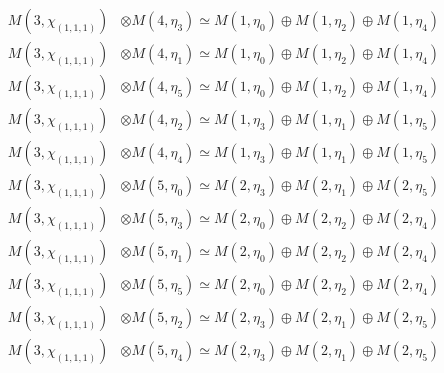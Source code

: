 \begin{align*}
M(3,\chi_{(1,1,1)}) &\otimes M(4,\eta_{3}) \simeq M(1,\eta_{0}) \oplus M(1,\eta_{2}) \oplus M(1,\eta_{4})\\
M(3,\chi_{(1,1,1)}) &\otimes M(4,\eta_{1}) \simeq M(1,\eta_{0}) \oplus M(1,\eta_{2}) \oplus M(1,\eta_{4})\\
M(3,\chi_{(1,1,1)}) &\otimes M(4,\eta_{5}) \simeq M(1,\eta_{0}) \oplus M(1,\eta_{2}) \oplus M(1,\eta_{4})\\
M(3,\chi_{(1,1,1)}) &\otimes M(4,\eta_{2}) \simeq M(1,\eta_{3}) \oplus M(1,\eta_{1}) \oplus M(1,\eta_{5})\\
M(3,\chi_{(1,1,1)}) &\otimes M(4,\eta_{4}) \simeq M(1,\eta_{3}) \oplus M(1,\eta_{1}) \oplus M(1,\eta_{5})\\
M(3,\chi_{(1,1,1)}) &\otimes M(5,\eta_{0}) \simeq M(2,\eta_{3}) \oplus M(2,\eta_{1}) \oplus M(2,\eta_{5})\\
M(3,\chi_{(1,1,1)}) &\otimes M(5,\eta_{3}) \simeq M(2,\eta_{0}) \oplus M(2,\eta_{2}) \oplus M(2,\eta_{4})\\
M(3,\chi_{(1,1,1)}) &\otimes M(5,\eta_{1}) \simeq M(2,\eta_{0}) \oplus M(2,\eta_{2}) \oplus M(2,\eta_{4})\\
M(3,\chi_{(1,1,1)}) &\otimes M(5,\eta_{5}) \simeq M(2,\eta_{0}) \oplus M(2,\eta_{2}) \oplus M(2,\eta_{4})\\
M(3,\chi_{(1,1,1)}) &\otimes M(5,\eta_{2}) \simeq M(2,\eta_{3}) \oplus M(2,\eta_{1}) \oplus M(2,\eta_{5})\\
M(3,\chi_{(1,1,1)}) &\otimes M(5,\eta_{4}) \simeq M(2,\eta_{3}) \oplus M(2,\eta_{1}) \oplus M(2,\eta_{5})\\
\end{align*}

